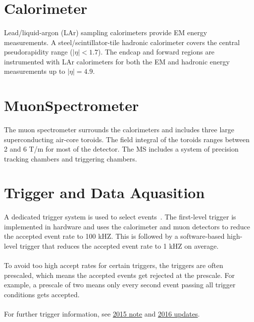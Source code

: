 \section{Calorimeter}
\paragraph{}
Lead/liquid-argon (LAr) sampling calorimeters provide EM energy measurements. 
A steel/scintillator-tile hadronic calorimeter covers the central pseudorapidity range ($|\eta| < 1.7$).
The endcap and forward regions are instrumented with LAr calorimeters
for both the EM and hadronic energy measurements up to $|\eta| = 4.9$.
\section{MuonSpectrometer}
\paragraph{}
The muon spectrometer surrounds the calorimeters and includes three large superconducting air-core toroids. 
The field integral of the toroids ranges between 2 and 6 T/m for most of the detector.
The MS includes a system of precision tracking chambers and triggering chambers.
\section{Trigger and Data Aquasition}
\paragraph{}
A dedicated trigger system is used to select events~\cite{ATLAS-TRIGGER}.
The first-level trigger is implemented in hardware and uses the calorimeter and muon detectors to reduce the accepted event rate to 100 kHZ.
This is followed by a software-based high-level trigger that reduces the accepted event rate to 1 kHZ on average.

\paragraph{}
To avoid too high accept rates for certain triggers, the triggers are often prescaled, which means the accepted events get rejected at the prescale. For example, a prescale of two means only every second event passing all trigger conditions gets accepted. 

\paragraph{}
For further trigger information, see \href{http://atlas.web.cern.ch/Atlas/GROUPS/PHYSICS/PAPERS/TRIG-2016-01/}{2015 note} and \href{https://cds.cern.ch/record/2242069/files/ATL-DAQ-PUB-2017-001.pdf}{2016 updates}.
